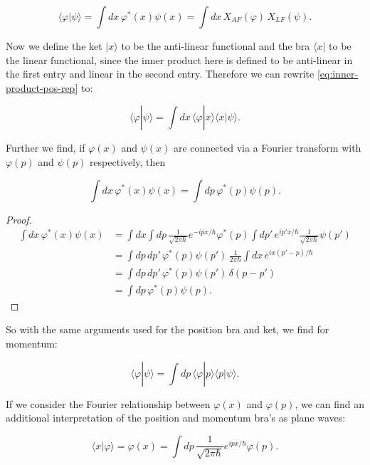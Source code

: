 \begin{equation}
\langle\varphi|\psi\rangle = \int dx\,\varphi^*(x)\psi(x) = \int dx\,X_{AF}(\varphi)\,X_{LF}(\psi). \label{eq:inner-product-pos-rep}
\end{equation}

Now we define the ket $|x\rangle$ to be the anti-linear functional and
the bra $\langle x|$ to be the linear functional, since the inner
product here is defined to be anti-linear in the first entry and
linear in the second entry. Therefore we can rewrite
\eqref{eq:inner-product-pos-rep} to:

\begin{equation}
\langle\varphi|\psi\rangle = \int dx\,\langle\varphi|x\rangle\langle x|\psi\rangle.
\end{equation}

Further we find, if $\varphi(x)$ and $\psi(x)$ are connected via a
Fourier transform with $\varphi(p)$ and $\psi(p)$ respectively, then

\begin{equation}
\int dx\,\varphi^*(x)\psi(x) = \int dp\,\varphi^*(p)\psi(p).
\end{equation}

\begin{proof}
\begin{align}
\int dx\,\varphi^*(x)\psi(x)
&= \int dx\int dp\,\frac{1}{\sqrt{2\pi\hbar}}e^{-ipx/\hbar}\varphi^*(p)
\int dp'\,e^{ip'x/\hbar}\frac{1}{\sqrt{2\pi\hbar}}\psi(p') \\
&= \int dp\,dp'\,\varphi^*(p)\psi(p')\,\frac{1}{2\pi\hbar}\int dx\,e^{ix(p'-p)/\hbar}\\
&= \int dp\,dp'\,\varphi^*(p)\psi(p')\,\delta(p-p')\\
&= \int dp\,\varphi^*(p)\psi(p).
\end{align}
\end{proof}

So with the same arguments used for the position bra and ket, we find
for momentum:

\begin{equation}
\langle\varphi|\psi\rangle = \int dp\,\langle\varphi|p\rangle\langle p|\psi\rangle.
\end{equation}

If we consider the Fourier relationship between $\varphi(x)$ and
$\varphi(p)$, we can find an additional interpretation of the position
and momentum bra's as plane waves:

\begin{equation}
\langle x|\varphi\rangle = \varphi(x) = \int dp\,\frac{1}{\sqrt{2\pi\hbar}}e^{ipx/\hbar}\varphi(p).
\end{equation}

